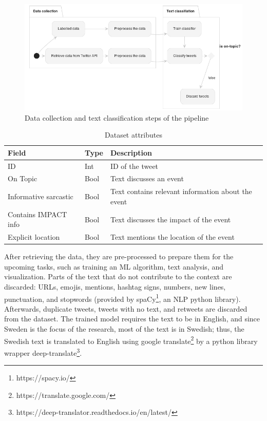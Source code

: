 \begin{figure}[H]
\begin{center}
  \includegraphics[width=\columnwidth]{./images/data_collection_text_classification.png}
\end{center}
\caption{Data collection and text classification steps of the pipeline}
\label{fig:flow_chart_data_collection_text_classification}
\end{figure}

\begin{table}
  \center
  \caption{Dataset attributes}
  \begin{tabular}{|l|l|l|}
    \hline
    Field & Type & Description \\
    \hline
    ID & Int & ID of the tweet\\
    \hline
    On Topic  & Bool & Text discusses an event \\
    \hline
    Informative sarcastic  & Bool & Text contains relevant information about the event \\
    \hline
    Contains IMPACT info & Bool & Text discusses the impact of the event \\
    \hline
    Explicit location & Bool & Text mentions the location of the event \\
    \hline
  \end{tabular}
  \label{tab:dataset_attr}
\end{table}

After retrieving the data, they are pre-processed to prepare them for the upcoming tasks, such as
training an \ac{ML} algorithm, text analysis, and visualization. Parts of the text that do not
contribute to the context are discarded: \ac{URL}s, emojis, mentions, hashtag signs, numbers, new
lines, punctuation, and stopwords (provided by spaCy\footnote{https://spacy.io/}, an \ac{NLP} python
library). Afterwards, duplicate tweets, tweets with no text, and retweets are discarded from the
dataset. The trained model requires the text to be in English, and since Sweden is the focus of the
research, most of the text is in Swedish; thus, the Swedish text is translated to English using
google translate\footnote{https://translate.google.com/} by a python library wrapper
deep-translate\footnote{https://deep-translator.readthedocs.io/en/latest/}. 

